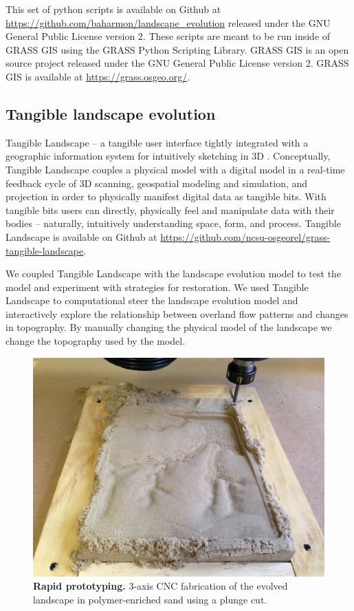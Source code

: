 \documentclass[10pt,letterpaper]{article}
\begin{document}
This set of python scripts is available on Github at \url{https://github.com/baharmon/landscape_evolution} released under the GNU General Public License version 2. These scripts are meant to be run inside of GRASS GIS using the GRASS Python Scripting Library. GRASS GIS is an open source project released under the GNU General Public License version 2. GRASS GIS is available at \url{https://grass.osgeo.org/}. 

\subsection*{Tangible landscape evolution}

Tangible Landscape -- a tangible user interface tightly integrated with a geographic information system for intuitively sketching in 3D \cite{petrasova2015}. Conceptually, Tangible Landscape couples a physical model with a digital model in a real-time feedback cycle of 3D scanning, geospatial modeling and simulation, and projection in order to physically manifest digital data as tangible bits. With tangible bits users can directly, physically feel and manipulate data with their bodies -- naturally, intuitively understanding space, form, and process. Tangible Landscape is available on Github at \url{https://github.com/ncsu-osgeorel/grass-tangible-landscape}.

We coupled Tangible Landscape with the landscape evolution model to test the model and experiment with strategies for restoration. 
We used Tangible Landscape to computational steer the landscape evolution model and interactively explore the relationship between overland flow patterns and changes in topography. By manually changing the physical model of the landscape 
we change the topography used by the model.

\begin{figure}
\centering
\includegraphics[width=\textwidth]{images/cnc_sand.jpg}
\caption{{\bf Rapid prototyping.}
3-axis CNC fabrication of the evolved landscape in polymer-enriched sand using a plunge cut.}
\label{fig:cnc_sand}
\end{figure}
\end{document}
